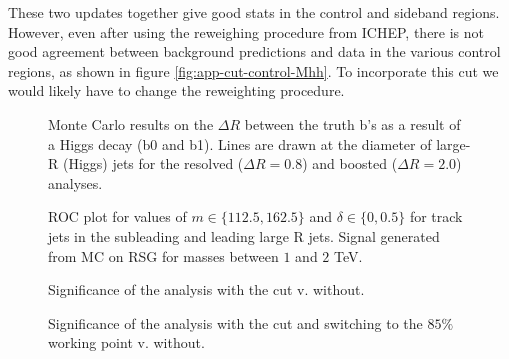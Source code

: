 These two updates together give good stats in the control and sideband regions. However, even after using the reweighing procedure from ICHEP, there is not good agreement between background predictions and data in the various control regions, as shown in figure \ref{fig:app-cut-control-Mhh}. To incorporate this cut we would likely have to change the reweighting procedure.

\begin{figure}[htbp]
\begin{center}
\caption{Monte Carlo results on the $\Delta R$ between the truth b's as a result of a Higgs decay (b0 and b1). Lines are drawn at the diameter of large-R (Higgs) jets for the resolved ($\Delta R = 0.8$) and boosted ($\Delta R = 2.0$) analyses.}
\label{fig:app-cut-bdR}
\end{center}
\end{figure}

\begin{figure}[htbp!]
\begin{center}
\qquad
\caption{ROC plot for values of $m \in \{ 112.5, 162.5\}$ and $\delta \in \{0 , 0.5 \}$ for track jets in the subleading and leading large R jets. Signal generated from MC on RSG for masses between $1$ and $2$ TeV.}
\label{fig:app-cut-rocplots}
\end{center}
\end{figure}

\begin{figure}[htbp]
\begin{center}
\caption{Significance of the analysis with the cut v. without.}
\label{fig:app-cut-significance-77}
\end{center}
\end{figure}

\begin{figure}[htbp]
\begin{center}
\caption{Significance of the analysis with the cut and switching to the $85\%$ working point v. without.}
\label{fig:app-cut-significance-85}
\end{center}
\end{figure}


